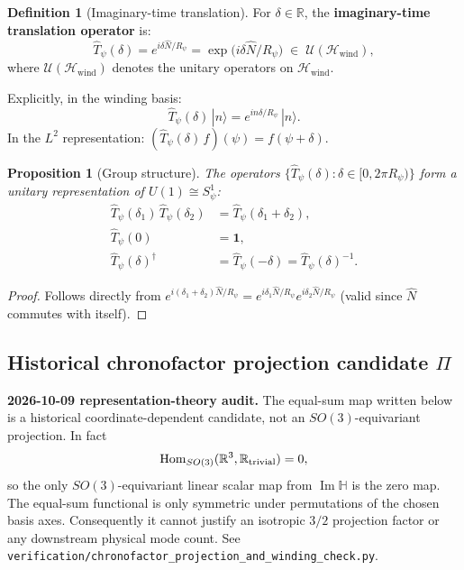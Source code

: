 \documentclass[12pt,a4paper]{article}
\newtheorem{proposition}[theorem]{Proposition}
\theoremstyle{definition}
\newtheorem{definition}[theorem]{Definition}
\theoremstyle{remark}
\begin{document}
\begin{definition}[Imaginary-time translation]
\label{def:chron:Tpsi}
For $\delta \in \mathbb{R}$, the \textbf{imaginary-time translation operator} is:
\begin{equation}
  \hat{T}_\psi(\delta)
  = e^{i\delta\hat{N}/R_\psi}
  = \exp\!\bigl(i\delta\hat{N}/R_\psi\bigr)
  \;\in\; \mathcal{U}(\mathcal{H}_{\mathrm{wind}}),
  \label{eq:chron:Tpsi}
\end{equation}
where $\mathcal{U}(\mathcal{H}_{\mathrm{wind}})$ denotes the unitary operators on
$\mathcal{H}_{\mathrm{wind}}$.

Explicitly, in the winding basis:
\begin{equation}
  \hat{T}_\psi(\delta)\,|n\rangle
  = e^{in\delta/R_\psi}\,|n\rangle.
  \label{eq:chron:Tpsi_action}
\end{equation}
In the $L^2$ representation: $(\hat{T}_\psi(\delta)\,f)(\psi) = f(\psi + \delta)$.
\end{definition}

\begin{proposition}[Group structure]
\label{prop:chron:group}
The operators $\{\hat{T}_\psi(\delta) : \delta \in [0, 2\pi R_\psi)\}$ form a
unitary representation of $U(1) \cong S^1_\psi$:
\begin{align}
  \hat{T}_\psi(\delta_1)\,\hat{T}_\psi(\delta_2) &= \hat{T}_\psi(\delta_1 + \delta_2),
  \label{eq:chron:T_group1}\\
  \hat{T}_\psi(0) &= \mathbf{1},
  \label{eq:chron:T_group2}\\
  \hat{T}_\psi(\delta)^\dagger &= \hat{T}_\psi(-\delta) = \hat{T}_\psi(\delta)^{-1}.
  \label{eq:chron:T_group3}
\end{align}
\end{proposition}

\begin{proof}
Follows directly from $e^{i(\delta_1+\delta_2)\hat{N}/R_\psi} = e^{i\delta_1\hat{N}/R_\psi}e^{i\delta_2\hat{N}/R_\psi}$
(valid since $\hat{N}$ commutes with itself).
\end{proof}

\subsection{Historical chronofactor projection candidate $\Pi$}

\begin{warnbox}
\textbf{2026-10-09 representation-theory audit.}
The equal-sum map written below is a historical coordinate-dependent candidate,
not an $SO(3)$-equivariant projection. In fact
\[
 \operatorname{Hom}_{SO(3)}(\mathbb R^3,\mathbb R_{\rm trivial})=0,
\]
so the only $SO(3)$-equivariant linear scalar map from
$\operatorname{Im}\mathbb H$ is the zero map. The equal-sum functional is
only symmetric under permutations of the chosen basis axes. Consequently it
cannot justify an isotropic $3/2$ projection factor or any downstream physical
mode count. See
\texttt{verification/chronofactor\_projection\_and\_winding\_check.py}.
\end{warnbox}
\end{document}
